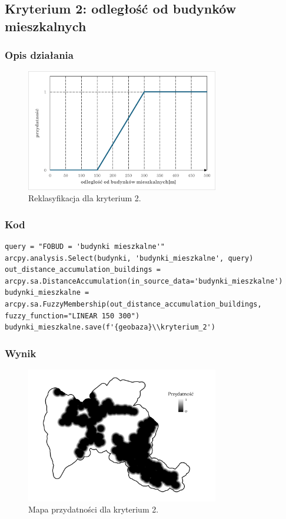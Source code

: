 \documentclass{article}
\begin{document}
\newpage
\subsection{Kryterium 2: odległość od budynków mieszkalnych}
\subsubsection{Opis działania}
\begin{figure}[H]
    \centering
    \includegraphics[width=0.75\textwidth]{img/kryterium2-wykres-glowny.png}
    \caption*{Reklasyfikacja dla kryterium 2.}
\end{figure}

\subsubsection{Kod}
\begin{lstlisting}
query = "FOBUD = 'budynki mieszkalne'"
arcpy.analysis.Select(budynki, 'budynki_mieszkalne', query)
out_distance_accumulation_buildings = arcpy.sa.DistanceAccumulation(in_source_data='budynki_mieszkalne')
budynki_mieszkalne = arcpy.sa.FuzzyMembership(out_distance_accumulation_buildings, fuzzy_function="LINEAR 150 300")
budynki_mieszkalne.save(f'{geobaza}\\kryterium_2')
\end{lstlisting}

\subsubsection{Wynik}
\begin{figure}[H]
    \centering
    \includegraphics[width=0.75\textwidth]{img/kryterium2-layout.jpg}
    \caption*{Mapa przydatności dla kryterium 2.}
\end{figure}
\end{document}
